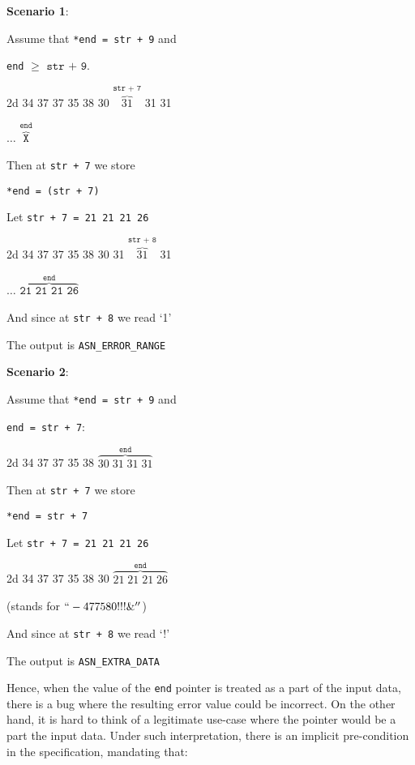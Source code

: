\documentclass{article}
\begin{document}
\begin{multicols}{2}
  
    {\bf Scenario 1}:

    Assume that \texttt{*end = str + 9} and

    \texttt{end} $\geq$ $\texttt{str + 9}$.

    {\color{red}2d 34 37 37 35 38 30 {\color{blue}$\overbrace{31}^{\texttt{str + 7}}$} 31 31

      $\ldots$ $\overbrace{\texttt{X}}^{\texttt{end}}$}

    Then at \texttt{str + 7} we store

    \texttt{*end = (str + 7)}

     Let \texttt{str + 7 = 21 21 21 26} 

     {\color{red}2d 34 37 37 35 38 30 31 {\color{blue} $\overbrace{31}^{\texttt{str + 8}}$} 31

       $\ldots$ $\overbrace{\texttt{21 21 21 26}}^{\texttt{end}}$}
     
     
     And since at \texttt{str + 8} we read `1'
     

     
     The output is  {\color{green}\texttt{ASN\_ERROR\_RANGE}}
     \columnbreak
     
    {\bf Scenario 2}:

    Assume that \texttt{*end = str + 9} and

    \texttt{end = str + 7}:
    
    {\color{red}2d 34 37 37 35 38 {\color{blue} $\overbrace{30 \; 31 \; 31 \; 31}^{\texttt{end}}$}}
    

    Then at \texttt{str + 7} we store

    \texttt{*end = str + 7}

     Let \texttt{str + 7 = 21 21 21 26} 

   
    {\color{red}2d 34 37 37 35 38 30 {\color{blue}$\overbrace{21 \; 21 \; 21 \; 26}^{\texttt{end}}$}}

    (stands for $``-477580!!!\&''$)

    And since at \texttt{str + 8} we read `!' 

    The output is {\color{red}\texttt{ASN\_EXTRA\_DATA}}
    \end{multicols}
    

Hence, when the value of the \texttt{end} pointer is treated as a part of the input data, there is a bug where the resulting error value could be incorrect. On the other hand, it is hard to think of a legitimate use-case where the pointer would be a part the input data. Under such interpretation, there is an implicit pre-condition in the specification, mandating that:
\end{document}
